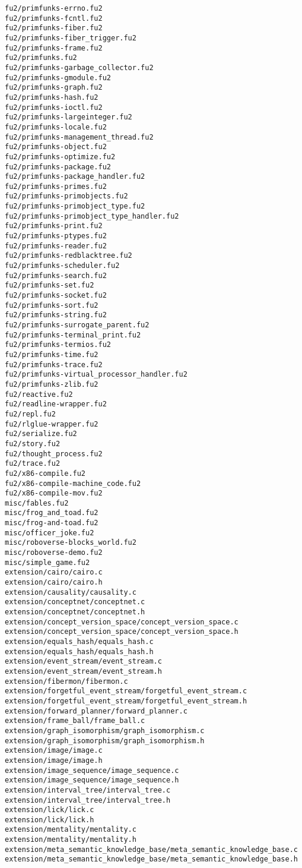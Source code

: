 \begin{lstlisting}
fu2/primfunks-errno.fu2
fu2/primfunks-fcntl.fu2
fu2/primfunks-fiber.fu2
fu2/primfunks-fiber_trigger.fu2
fu2/primfunks-frame.fu2
fu2/primfunks.fu2
fu2/primfunks-garbage_collector.fu2
fu2/primfunks-gmodule.fu2
fu2/primfunks-graph.fu2
fu2/primfunks-hash.fu2
fu2/primfunks-ioctl.fu2
fu2/primfunks-largeinteger.fu2
fu2/primfunks-locale.fu2
fu2/primfunks-management_thread.fu2
fu2/primfunks-object.fu2
fu2/primfunks-optimize.fu2
fu2/primfunks-package.fu2
fu2/primfunks-package_handler.fu2
fu2/primfunks-primes.fu2
fu2/primfunks-primobjects.fu2
fu2/primfunks-primobject_type.fu2
fu2/primfunks-primobject_type_handler.fu2
fu2/primfunks-print.fu2
fu2/primfunks-ptypes.fu2
fu2/primfunks-reader.fu2
fu2/primfunks-redblacktree.fu2
fu2/primfunks-scheduler.fu2
fu2/primfunks-search.fu2
fu2/primfunks-set.fu2
fu2/primfunks-socket.fu2
fu2/primfunks-sort.fu2
fu2/primfunks-string.fu2
fu2/primfunks-surrogate_parent.fu2
fu2/primfunks-terminal_print.fu2
fu2/primfunks-termios.fu2
fu2/primfunks-time.fu2
fu2/primfunks-trace.fu2
fu2/primfunks-virtual_processor_handler.fu2
fu2/primfunks-zlib.fu2
fu2/reactive.fu2
fu2/readline-wrapper.fu2
fu2/repl.fu2
fu2/rlglue-wrapper.fu2
fu2/serialize.fu2
fu2/story.fu2
fu2/thought_process.fu2
fu2/trace.fu2
fu2/x86-compile.fu2
fu2/x86-compile-machine_code.fu2
fu2/x86-compile-mov.fu2
misc/fables.fu2
misc/frog_and_toad.fu2
misc/frog-and-toad.fu2
misc/officer_joke.fu2
misc/roboverse-blocks_world.fu2
misc/roboverse-demo.fu2
misc/simple_game.fu2
extension/cairo/cairo.c
extension/cairo/cairo.h
extension/causality/causality.c
extension/conceptnet/conceptnet.c
extension/conceptnet/conceptnet.h
extension/concept_version_space/concept_version_space.c
extension/concept_version_space/concept_version_space.h
extension/equals_hash/equals_hash.c
extension/equals_hash/equals_hash.h
extension/event_stream/event_stream.c
extension/event_stream/event_stream.h
extension/fibermon/fibermon.c
extension/forgetful_event_stream/forgetful_event_stream.c
extension/forgetful_event_stream/forgetful_event_stream.h
extension/forward_planner/forward_planner.c
extension/frame_ball/frame_ball.c
extension/graph_isomorphism/graph_isomorphism.c
extension/graph_isomorphism/graph_isomorphism.h
extension/image/image.c
extension/image/image.h
extension/image_sequence/image_sequence.c
extension/image_sequence/image_sequence.h
extension/interval_tree/interval_tree.c
extension/interval_tree/interval_tree.h
extension/lick/lick.c
extension/lick/lick.h
extension/mentality/mentality.c
extension/mentality/mentality.h
extension/meta_semantic_knowledge_base/meta_semantic_knowledge_base.c
extension/meta_semantic_knowledge_base/meta_semantic_knowledge_base.h

\end{lstlisting}
